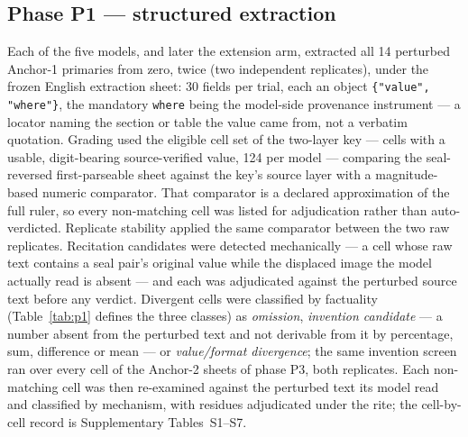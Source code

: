 \documentclass[11pt]{article}
\begin{document}
\subsection{Phase P1 --- structured extraction}
Each of the five models, and later the extension arm, extracted all 14 perturbed Anchor-1 primaries from zero, twice (two independent replicates), under the frozen English extraction sheet: 30 fields per trial, each an object \texttt{\{"value", "where"\}}, the mandatory \texttt{where} being the model-side provenance instrument --- a locator naming the section or table the value came from, not a verbatim quotation. Grading used the eligible cell set of the two-layer key --- cells with a usable, digit-bearing source-verified value, 124 per model --- comparing the seal-reversed first-parseable sheet against the key's source layer with a magnitude-based numeric comparator. That comparator is a declared approximation of the full ruler, so every non-matching cell was listed for adjudication rather than auto-verdicted. Replicate stability applied the same comparator between the two raw replicates. Recitation candidates were detected mechanically --- a cell whose raw text contains a seal pair's original value while the displaced image the model actually read is absent --- and each was adjudicated against the perturbed source text before any verdict. Divergent cells were classified by factuality (Table~\ref{tab:p1} defines the three classes) as \emph{omission}, \emph{invention candidate} --- a number absent from the perturbed text and not derivable from it by percentage, sum, difference or mean --- or \emph{value/format divergence}; the same invention screen ran over every cell of the Anchor-2 sheets of phase P3, both replicates. Each non-matching cell was then re-examined against the perturbed text its model read and classified by mechanism, with residues adjudicated under the rite; the cell-by-cell record is Supplementary Tables~S1--S7.
\end{document}
